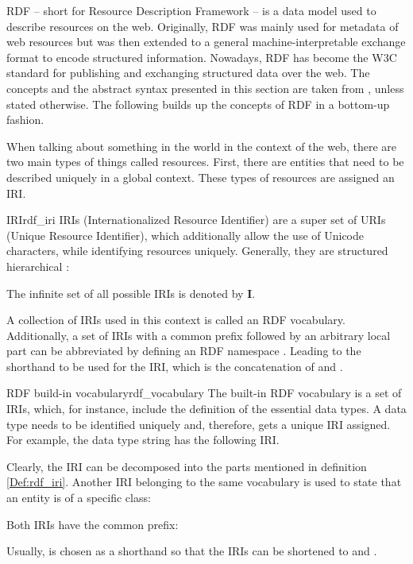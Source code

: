 RDF -- short for Resource Description Framework -- is a data model used to describe resources on the web. Originally, RDF was mainly used for metadata of web resources but was then extended to a general machine-interpretable exchange format to encode structured information. Nowadays, RDF has become the W3C standard for publishing and exchanging structured data over the web. The concepts and the abstract syntax presented in this section are taken from \cite{world2014rdf}, unless stated otherwise. The following builds up the concepts of RDF in a bottom-up fashion.

When talking about something in the world in the context of the web, there are two main types of things called resources. First, there are entities that need to be described uniquely in a global context. These types of resources are assigned an IRI.

\begin{Def}{IRI}{rdf_iri}
IRIs (\glqq{}Internationalized Resource Identifier\grqq{}) are a super set of URIs (\glqq{}Unique Resource Identifier\grqq{}), which additionally allow the use of Unicode characters, while identifying resources uniquely. Generally, they are structured hierarchical \cite{berners1998rfc2396}:
\begin{center}
\end{center}
The infinite set of all possible IRIs is denoted by $\mathbf{I}$.
\end{Def}

A collection of IRIs used in this context is called an RDF vocabulary. Additionally, a set of IRIs with a common prefix  followed by an arbitrary local part  can be abbreviated by defining an RDF namespace . Leading to the shorthand  to be used for the IRI, which is the concatenation of  and .

\begin{Bsp}{RDF build-in vocabulary}{rdf_vocabulary}
    The built-in RDF vocabulary is a set of IRIs, which, for instance, include the definition of the essential data types. A data type needs to be identified uniquely and, therefore, gets a unique IRI assigned.
    For example, the data type string has the following IRI.
    \begin{center}
    \end{center}
    Clearly, the IRI can be decomposed into the parts mentioned in definition \ref{Def:rdf_iri}.
    Another IRI belonging to the same vocabulary is used to state that an entity is of a specific class:
    \begin{center}
    \end{center}
    Both IRIs have the common prefix:
    \begin{center}
    \end{center}
    Usually,  is chosen as a shorthand so that the IRIs can be shortened to  and .
\end{Bsp}

